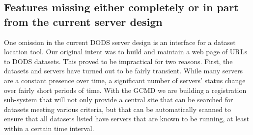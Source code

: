 \documentclass[12pt]{article}
\begin{document}
\subsection{Features missing either completely or in part from the 
current server design}

One omission in the current \ac{DODS} server design is an interface for a
dataset location tool. Our original intent was to build and maintain a web
page of \acs{URL}s to \ac{DODS} datasets. This proved to be impractical for
two reasons.  First, the datasets and servers have turned out to be fairly
transient.  While many servers are a constant presence over time, a
significant number of servers' status change over fairly short periods of
time. With the \ac{GCMD} \cite{gcmd} we are building a registration
sub-system that will not only provide a central site that can be searched for
datasets meeting various criteria, but that can be automatically scanned to
ensure that all datasets listed have servers that are known to be running, at
least within a certain time interval.

%
\end{document}
